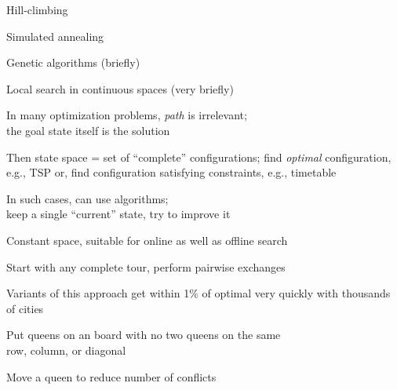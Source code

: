 \documentclass{article}
\begin{document}
\begin{huge}

\sf


\blob Hill-climbing

\blob Simulated annealing

\blob Genetic algorithms (briefly)

\blob Local search in continuous spaces (very briefly)



In many optimization problems, \emph{path} is irrelevant;\\
the goal state itself is the solution

Then state space = set of ``complete'' configurations;\nl
find \emph{optimal} configuration, e.g., TSP\nl
or, find configuration satisfying constraints, e.g., timetable

In such cases, can use  algorithms;\\
keep a single ``current'' state, try to improve it

Constant space, suitable for online as well as offline search





Start with any complete tour, perform pairwise exchanges

\vspace*{0.3in}

\textwidth
{}

Variants of this approach get within 1\% of optimal very quickly with
thousands of cities



Put  queens on an  board with no two queens
on the same\\
row, column, or diagonal

Move a queen to reduce number of conflicts

\vspace*{0.3in}


\end{huge}
\end{document}
